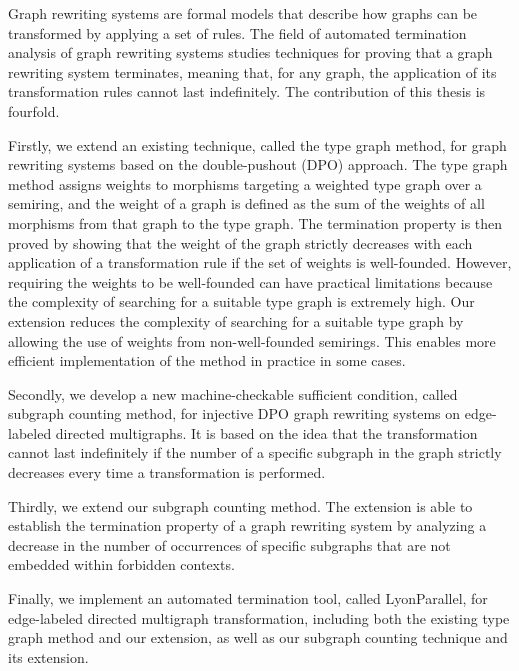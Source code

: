 Graph rewriting systems are formal models that describe how graphs can be transformed by applying a set of rules. The field of automated termination analysis of graph rewriting systems studies techniques for proving that a graph rewriting system terminates, meaning that, for any graph, the application of its transformation rules cannot last indefinitely. The contribution of this thesis is fourfold.

Firstly, we extend an existing technique, called the type graph method, for graph rewriting systems based on the double-pushout (DPO) approach. The type graph method assigns weights to morphisms targeting a weighted type graph over a semiring, and the weight of a graph is defined as the sum of the weights of all morphisms from that graph to the type graph. The termination property is then proved by showing that the weight of the graph strictly decreases with each application of a transformation rule if the set of weights is well-founded. However, requiring the weights to be well-founded can have practical limitations because the complexity of searching for a suitable type graph is extremely high.
Our extension reduces the complexity of searching for a suitable type graph by allowing the use of weights from non-well-founded semirings. This enables more efficient implementation of the method in practice in some cases.

Secondly, we develop a new machine-checkable sufficient condition, called subgraph counting method, for injective DPO graph rewriting systems on edge-labeled directed multigraphs. It is based on the idea that the transformation cannot last indefinitely if the number of a specific subgraph in the graph strictly decreases every time a transformation is performed.

Thirdly, we extend our subgraph counting method. The extension is able to establish the termination property of a graph rewriting system by analyzing a decrease in the number of occurrences of specific subgraphs that are not embedded within forbidden contexts. 

Finally, we implement an automated termination tool, called LyonParallel, for edge-labeled directed multigraph transformation, including both the existing
type graph method and our extension, as well as our subgraph counting technique and its extension. 







